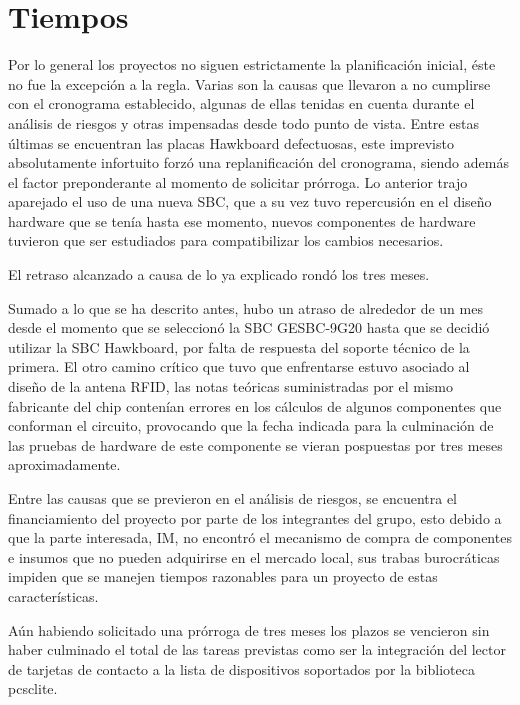 \chapter{Tiempos}

Por lo general los proyectos no siguen estrictamente la planificación inicial,
éste no fue la excepción a la regla. Varias son la causas que llevaron a no 
cumplirse con el cronograma establecido, algunas de ellas tenidas en cuenta 
durante el análisis de riesgos y otras impensadas desde todo punto de vista.
Entre estas últimas se encuentran las placas Hawkboard defectuosas, este 
imprevisto absolutamente infortuito forzó una replanificación del cronograma,
siendo además el factor preponderante al momento de solicitar prórroga. Lo 
anterior trajo aparejado el uso de una nueva SBC, que a su vez tuvo repercusión
en el diseño hardware que se tenía hasta ese momento, nuevos componentes de 
hardware tuvieron que ser estudiados para compatibilizar los cambios necesarios.

\bigskip
El retraso alcanzado a causa de lo ya explicado rondó los tres meses.

\bigskip
Sumado a lo que se ha descrito antes, hubo un atraso de alrededor de un mes desde el momento que se seleccionó la SBC GESBC-9G20 hasta que se decidió utilizar la SBC Hawkboard, por falta de respuesta del soporte técnico de la primera. El otro camino crítico que tuvo que
enfrentarse estuvo asociado al diseño de la antena RFID, las notas teóricas
suministradas por el mismo fabricante del chip contenían errores en los
cálculos de algunos componentes que conforman el circuito, provocando que 
la fecha indicada para la culminación de las pruebas de hardware de este 
componente se vieran pospuestas por tres meses aproximadamente. 

\bigskip
Entre las causas que se previeron en el análisis de riesgos, se encuentra el 
financiamiento del proyecto por parte de los integrantes del grupo, esto 
debido a que la parte interesada, IM, no encontró el mecanismo de compra de 
componentes e insumos que no pueden adquirirse en el mercado local, sus trabas 
burocráticas impiden que se manejen tiempos razonables para un proyecto de estas 
características.

\bigskip
Aún habiendo solicitado una prórroga de tres meses los plazos se vencieron sin 
haber culminado el total de las tareas previstas como ser la integración del 
lector de tarjetas de contacto a la lista de dispositivos soportados por la 
biblioteca pcsclite. 

